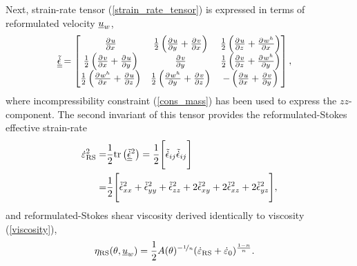 Next, strain-rate tensor (\ref{strain_rate_tensor}) is expressed in terms of reformulated velocity $\underline{u}_w$, 
\begin{align}
  \label{rs_strain_rate_tensor}
  \tilde{\underline{\underline{\dot{\epsilon}}}}
  &= \begin{bmatrix}
       \frac{\partial^{} u}{\partial x^{} } & \frac{1}{2}\left( \frac{\partial^{} u}{\partial y^{} } + \frac{\partial^{} v}{\partial x^{} } \right) & \frac{1}{2}\left( \frac{\partial^{} u}{\partial z^{} } + \frac{\partial^{} w^h}{\partial x^{} } \right) \\
       \frac{1}{2}\left( \frac{\partial^{} v}{\partial x^{} } + \frac{\partial^{} u}{\partial y^{} } \right) & \frac{\partial^{} v}{\partial y^{} } & \frac{1}{2}\left( \frac{\partial^{} v}{\partial z^{} } + \frac{\partial^{} w^h}{\partial y^{} } \right) \\
       \frac{1}{2}\left( \frac{\partial^{} w^h}{\partial x^{} } + \frac{\partial^{} u}{\partial z^{} } \right) & \frac{1}{2}\left( \frac{\partial^{} w^h}{\partial y^{} } + \frac{\partial^{} v}{\partial z^{} } \right) & -\left( \frac{\partial^{} u}{\partial x^{} } + \frac{\partial^{} v}{\partial y^{} } \right)
     \end{bmatrix},
\end{align}
where incompressibility constraint (\ref{cons_mass}) has been used to express the $zz$-component.  The second invariant of this tensor provides the reformulated-Stokes effective strain-rate
\begin{align}
  \dot{\varepsilon}_{\text{RS}}^2 = & \frac{1}{2} \mathrm{tr}\left( \tilde{\underline{\underline{\dot{\epsilon}}}}^2 \right) = \frac{1}{2} \Bigg[ \tilde{\dot{\epsilon}}_{ij} \tilde{\dot{\epsilon}}_{ij} \Bigg] \notag \\
  \label{rs_effective_strain_rate}
  = &\frac{1}{2} \Bigg[ \tilde{\dot{\epsilon}}_{xx}^2 + \tilde{\dot{\epsilon}}_{yy}^2 + \tilde{\dot{\epsilon}}_{zz}^2 + 2\tilde{\dot{\epsilon}}_{xy}^2 + 2\tilde{\dot{\epsilon}}_{xz}^2 + 2\tilde{\dot{\epsilon}}_{yz}^2 \Bigg],
\end{align}
and reformulated-Stokes shear viscosity derived identically to viscosity (\ref{viscosity}),
\begin{align}
  \label{rs_viscosity}
  \eta_{\text{RS}}(\theta, \underline{u}_w) &= \frac{1}{2}A(\theta)^{-\nicefrac{1}{n}} (\dot{\varepsilon}_{\text{RS}} + \dot{\varepsilon}_0)^{\frac{1-n}{n}}.
\end{align} 


